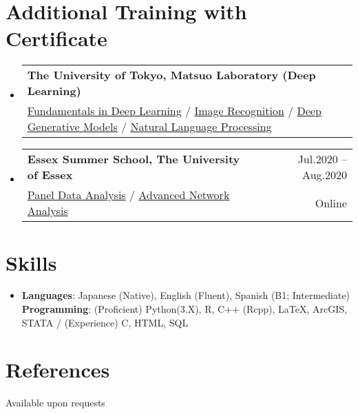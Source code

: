 \documentclass[letterpaper,11pt]{article} %
\makeatletter
\newcommand{\CVSubheading}[4]{
  \vspace{-2pt}\item
    \begin{tabular*}{0.97\textwidth}[t]{l@{\extracolsep{\fill}}r}
      \textbf{#1} & #2 \\
      \small#3 & \small #4 \\
    \end{tabular*}\vspace{-7pt}
}
\newcommand{\CVSubHeadingListStart}{\begin{itemize}[leftmargin=0.5cm, label={}]}
\newcommand{\CVSubHeadingListEnd}{\end{itemize}}
\makeatother
\begin{document}
\section{Additional Training with Certificate}
  \CVSubHeadingListStart
    \CVSubheading
      {The University of Tokyo, Matsuo Laboratory (Deep Learning)}{}
      {\textcolor{sanguria}{\href{https://www.dropbox.com/s/6ism7kpto4vm6bz/Matsuo\%20Labo\%20Fundamentals.pdf?dl=0}{Fundamentals in Deep Learning}}
       /  \textcolor{sanguria}{\href{https://www.dropbox.com/s/5z06mt1z06wlnyg/Matsuo\%20Labo\%20Image\%20Recognition.pdf?dl=0}{Image Recognition}}
       / \textcolor{sanguria}{\href{https://www.dropbox.com/s/euozc42m950jgb3/Matsuo\%20Labo\%20Generative\%20Models.pdf?dl=0}{Deep Generative Models}}
       / \textcolor{sanguria}{\href{https://www.dropbox.com/s/45g6c7y5qxpdsb5/Matsuo\%20Labo\%20NLP.pdf?dl=0}{Natural Language Processing}}
       }{}
     \CVSubheading
      {Essex Summer School, The University of Essex}{Jul.2020 -- Aug.2020}
      {\textcolor{sanguria}{\href{https://www.dropbox.com/s/rsligjfbuhfxppv/Essex\%20Panel.pdf?dl=0}{Panel Data Analysis}}
      / 
      \textcolor{sanguria}{\href{https://www.dropbox.com/s/dqc4y6a5rpnkip6/Essex\%20Network.pdf?dl=0}{Advanced Network Analysis}}
      }{Online}
  \CVSubHeadingListEnd


\begin{comment}
This section is compressed from the various skills sections that Euro CV
recommends.
\end{comment}

\section{Skills}
\begin{itemize}[leftmargin=0.5cm, label={}]
    \item{
     \textbf{Languages}{: Japanese (Native), English (Fluent), Spanish (B1; Intermediate)} \\
     \textbf{Programming}{: (Proficient) Python(3.X), R, C++ (Rcpp), \LaTeX, ArcGIS, STATA / (Experience) C, HTML, SQL}
    }
\end{itemize}

\section{References}
Available upon requests

\end{document}
